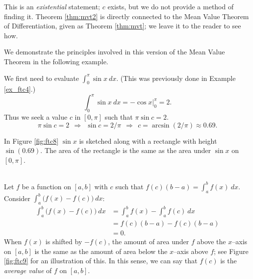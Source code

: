 This is an \emph{existential} statement; $c$ exists, but we do not provide a method of finding it. Theorem \ref{thm:mvt2} is directly connected to the Mean Value Theorem of Differentiation, given %
as Theorem \ref{thm:mvt}; we leave it to the reader to see how.

We demonstrate the principles involved in this version of the Mean Value Theorem in the following example.\\

{We first need to evaluate $\int_0^\pi \sin x\ dx$. (This was previously done in Example \ref{ex_ftc4}.)
		\[
		\int_0^\pi\sin x\ dx =	-\cos x \Big|_0^\pi = 2.
		\]
Thus we seek a value $c$ in $[0,\pi]$ such that $\pi\sin c =2$. 
\[
\pi\sin c = 2\ \ \Rightarrow\ \ \sin c = 2/\pi\ \ \Rightarrow\ \ c = \arcsin(2/\pi) \approx 0.69.
\]

In Figure \ref{fig:ftc8} $\sin x$ is sketched along with a rectangle with height $\sin (0.69)$. The area of the rectangle is the same as the area under $\sin x$ on $[0,\pi]$.
}\\

Let $f$ be a function on $[a,b]$ with $c$ such that $f(c)(b-a) = \int_a^bf(x)\ dx$. Consider $\int_a^b\big(f(x)-f(c)\big)\ dx$:
\begin{align*}
	\int_a^b\big(f(x)-f(c)\big)\ dx &=	\int_a^b f(x) - \int_a^b f(c)\ dx\\
							&= f(c)(b-a) - f(c)(b-a) \\
							&= 0.
\end{align*}
When $f(x)$ is shifted by $-f(c)$, the amount of area under $f$ above the $x$--axis on $[a,b]$ is the same as the amount of area below the $x$--axis above $f$; see Figure \ref{fig:ftc9} for an illustration of this. In this sense, we can say that $f(c)$ is the \textit{average value} of $f$ on $[a,b]$. 


